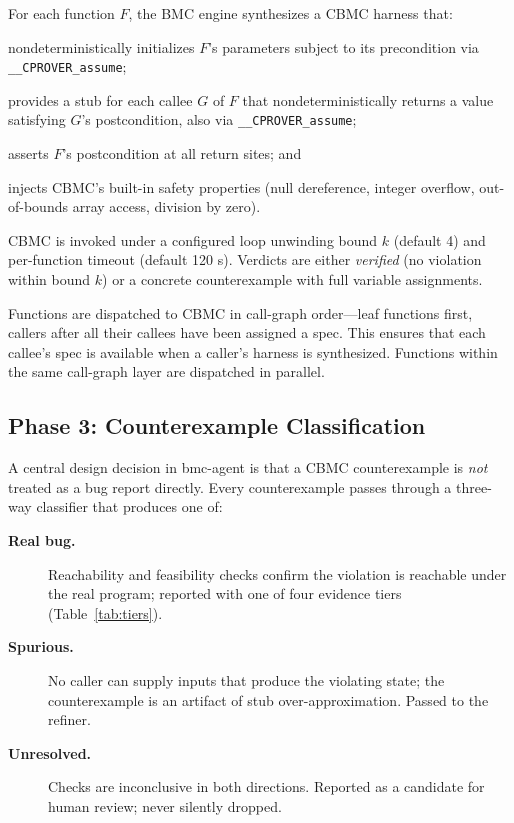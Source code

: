 \documentclass[11pt,a4paper]{article}
\newcommand{\tool}{bmc-agent\xspace}
\begin{document}
For each function $F$, the BMC engine synthesizes a CBMC harness that:
\begin{enumerate*}[label=(\roman*)]
  \item nondeterministically initializes $F$'s parameters subject to its
    precondition via \lstinline{__CPROVER_assume};
  \item provides a stub for each callee $G$ of $F$ that nondeterministically
    returns a value satisfying $G$'s postcondition, also via
    \lstinline{__CPROVER_assume};
  \item asserts $F$'s postcondition at all return sites; and
  \item injects CBMC's built-in safety properties (null dereference, integer
    overflow, out-of-bounds array access, division by zero).
\end{enumerate*}
CBMC is invoked under a configured loop unwinding bound $k$ (default 4) and
per-function timeout (default 120 s). Verdicts are either \emph{verified}
(no violation within bound $k$) or a concrete counterexample with full
variable assignments.

Functions are dispatched to CBMC in call-graph order---leaf functions first,
callers after all their callees have been assigned a spec. This ensures that
each callee's spec is available when a caller's harness is synthesized.
Functions within the same call-graph layer are dispatched in parallel.

\subsection{Phase 3: Counterexample Classification}
\label{sec:classifier}

A central design decision in \tool is that a CBMC counterexample is
\emph{not} treated as a bug report directly. Every counterexample passes
through a three-way classifier that produces one of:

\begin{description}
\item[\textbf{Real bug.}] Reachability and feasibility checks confirm the
  violation is reachable under the real program; reported with one of four
  evidence tiers (Table~\ref{tab:tiers}).
\item[\textbf{Spurious.}] No caller can supply inputs that produce the
  violating state; the counterexample is an artifact of stub
  over-approximation. Passed to the refiner.
\item[\textbf{Unresolved.}] Checks are inconclusive in both directions.
  Reported as a candidate for human review; never silently dropped.
\end{description}
\end{document}
